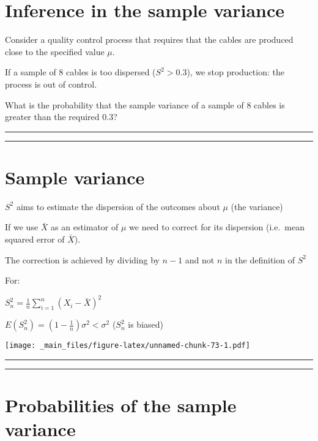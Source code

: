 \documentclass[
]{book}
\begin{document}
\hypertarget{inference-in-the-sample-variance}{%
\section{Inference in the sample variance}\label{inference-in-the-sample-variance}}

Consider a quality control process that requires that the cables are produced close to the specified value \(\mu\).

If a sample of \(8\) cables is too dispersed (\(S^2>0.3\)), we stop production: the process is out of control.

What is the probability that the sample variance of a sample of \(8\) cables is greater than the required \(0.3\)?

\begin{center}\rule{0.5\linewidth}{0.5pt}\end{center}

\begin{center}\rule{0.5\linewidth}{0.5pt}\end{center}

\hypertarget{sample-variance-3}{%
\section{Sample variance}\label{sample-variance-3}}

\(S^2\) aims to estimate the dispersion of the outcomes about \(\mu\) (the variance)

If we use \(\bar{X}\) as an estimator of \(\mu\) we need to correct for its dispersion (i.e.~mean squared error of \(\bar{X}\)).

The correction is achieved by dividing by \(n-1\) and not \(n\) in the definition of \(S^2\)

For:

\(S_n^2=\frac{1}{n}\sum_{i=1}^n (X_i-\bar{X})^2\)

\(E(S_n^2) = (1-\frac{1}{n})\sigma^2 < \sigma^2\) (\(S_n^2\) is biased)

\texttt{[image: \_main\_files/figure-latex/unnamed-chunk-73-1.pdf]}

\begin{center}\rule{0.5\linewidth}{0.5pt}\end{center}

\begin{center}\rule{0.5\linewidth}{0.5pt}\end{center}

\hypertarget{probabilities-of-the-sample-variance}{%
\section{Probabilities of the sample variance}\label{probabilities-of-the-sample-variance}}
\end{document}

